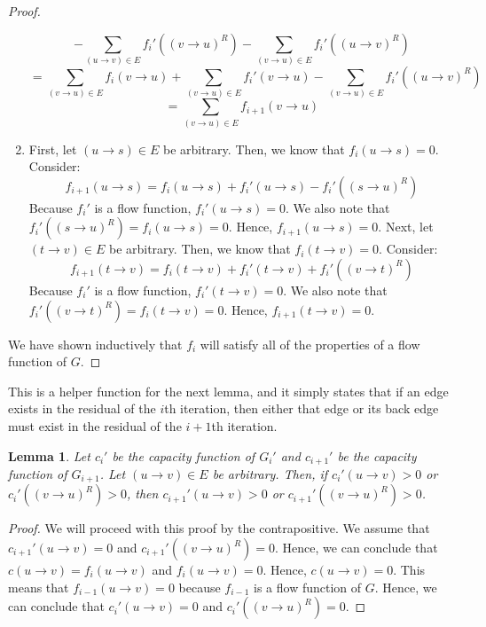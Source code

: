\documentclass{report}
\newtheorem{lemma}{Lemma}[section]
\begin{document}
\begin{proof}
\begin{enumerate}
            $$- \sum_{(u \rightarrow v) \in E}f_i'((v \rightarrow u)^R) - \sum_{(v \rightarrow u) \in E}f_i'((u \rightarrow v)^R)$$
            $$= \sum_{(v \rightarrow u) \in E}f_i(v \rightarrow u) + \sum_{(v \rightarrow u) \in E}f_i'(v \rightarrow u) - \sum_{(v \rightarrow u) \in E}f_i'((u \rightarrow v)^R)$$
            $$= \sum_{(v \rightarrow u) \in E}f_{i+1}(v \rightarrow u)$$
        \item
            First, let $(u \rightarrow s) \in E$ be arbitrary. Then, we know that $f_i(u \rightarrow s) = 0$. Consider:
            $$f_{i+1}(u \rightarrow s) = f_i(u \rightarrow s) + f_i'(u \rightarrow s) - f_i'((s \rightarrow u)^R)$$
            Because $f_i'$ is a flow function, $f_i'(u \rightarrow s) = 0$. We also note that $f_i'((s \rightarrow u)^R) = f_i(u \rightarrow s) = 0$. Hence, $f_{i+1}(u \rightarrow s) = 0$.
            Next, let $(t \rightarrow v) \in E$ be arbitrary. Then, we know that $f_i(t \rightarrow v) = 0$. Consider:
            $$f_{i+1}(t \rightarrow v) = f_i(t \rightarrow v) + f_i'(t \rightarrow v) + f_i'((v \rightarrow t)^R)$$
            Because $f_i'$ is a flow function, $f_i'(t \rightarrow v) = 0$. We also note that $f_i'((v \rightarrow t)^R) = f_i(t \rightarrow v) = 0$. Hence, $f_{i+1}(t \rightarrow v) = 0$.
    \end{enumerate}
    We have shown inductively that $f_i$ will satisfy all of the properties of a flow function of $G$.
\end{proof}

This is a helper function for the next lemma, and it simply states that if an edge exists in the residual of the $i$th iteration, then either that edge or its back edge must exist in the residual of the $i+1$th iteration.
\begin{lemma}
    Let $c_i'$ be the capacity function of $G_i'$ and $c_{i+1}'$ be the capacity function of $G_{i+1}$. Let $(u \rightarrow v) \in E$ be arbitrary. Then, if $c_i'(u \rightarrow v) > 0$ or $c_i'((v \rightarrow u)^R) > 0$, then $c_{i+1}'(u \rightarrow v) > 0$ or $c_{i+1}'((v \rightarrow u)^R) > 0$.
\end{lemma}
\begin{proof}
    We will proceed with this proof by the contrapositive. We assume that $c_{i+1}'(u \rightarrow v) = 0$ and $c_{i+1}'((v \rightarrow u)^R) = 0$. Hence, we can conclude that $c(u \rightarrow v) = f_i(u \rightarrow v)$ and $f_i(u \rightarrow v) = 0$. Hence, $c(u \rightarrow v) = 0$. This means that $f_{i-1}(u \rightarrow v) = 0$ because $f_{i-1}$ is a flow function of $G$. Hence, we can conclude that $c_i'(u \rightarrow v) = 0$ and $c_i'((v \rightarrow u)^R) = 0$.
\end{proof}
\end{document}
